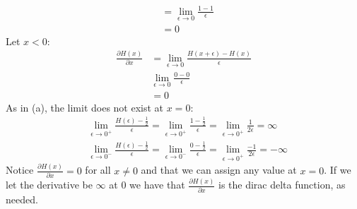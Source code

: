 \documentclass[paper=a4, fontsize=11pt]{scrartcl} %
\numberwithin{equation}{section} %
\numberwithin{figure}{section} %
\numberwithin{table}{section} %
\newcommand{\dP}[2]{\frac{\partial #1}{\partial #2}}
\begin{document}
\begin{enumerate}[(a)]
\begin{align*}
	&= \lim\limits_{\epsilon\rightarrow0}\frac{1-1}{\epsilon} \\
	&= 0
	\end{align*}
	Let $x<0$:
	\begin{align*} 
	\dP{H(x)}{x} &= \lim\limits_{\epsilon\rightarrow0}\frac{H(x+\epsilon)-H(x)}{\epsilon}\\
	&\lim\limits_{\epsilon\rightarrow0}\frac{0-0}{\epsilon} \\
	&= 0
	\end{align*}
	As in (a), the limit does not exist at $x=0$:
	\begin{align*}
	&\lim\limits_{\epsilon\rightarrow0^+}\frac{H(\epsilon)-\frac{1}{2}}{\epsilon} =\lim\limits_{\epsilon\rightarrow0^+}\frac{1-\frac{1}{2}}{\epsilon}=
	\lim\limits_{\epsilon\rightarrow0^+}\frac{1}{2\epsilon}= \infty
	\\
	&\lim\limits_{\epsilon\rightarrow0^-}\frac{H(\epsilon)-\frac{1}{2}}{\epsilon} = \lim\limits_{\epsilon\rightarrow0^-}\frac{0-\frac{1}{2}}{\epsilon} = \lim\limits_{\epsilon\rightarrow0^+}\frac{-1}{2\epsilon} = -\infty
	\end{align*}
	Notice $\dP{H(x)}{x} = 0$ for all $x \ne 0$ and that we can assign any value at $x=0$. If we let the derivative be $\infty$ at $0$ we have that $\dP{H(x)}{x}$ is the dirac delta function, as needed.
\end{enumerate}
\end{document}
